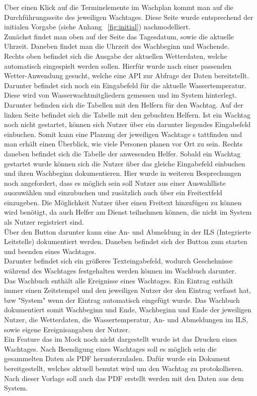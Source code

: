\documentclass[fontsize=12pt,openright,oneside,paper=a4,BCOR=1cm]{scrbook}
\begin{document}
Über einen Klick auf die Terminelemente im Wachplan kommt man auf die Durchführungsseite des jeweiligen Wachtages. Diese Seite wurde entsprechend der initialen Vorgabe (siehe Anhang ~\ref{fig:initial}) nachmodelliert. \\
Zunächst findet man oben auf der Seite das Tagesdatum, sowie die aktuelle Uhrzeit. Daneben findet man die Uhrzeit des Wachbeginn und Wachende. \\
Rechts oben befindet sich die Ausgabe der aktuellen Wetterdaten, welche automatisch eingespielt werden sollen. Hierfür wurde nach einer passenden Wetter-Anwendung gesucht, welche eine API zur Abfrage der Daten bereitstellt. Darunter befindet sich noch ein Eingabefeld für die aktuelle Wassertemperatur. Diese wird von Wasserwachtmitgliedern gemessen und im System hinterlegt. \\ 
Darunter befinden sich die Tabellen mit den Helfern für den Wachtag. Auf der linken Seite befindet sich die Tabelle mit den gebuchten Helfern. Ist ein Wachtag noch nicht gestartet, können sich Nutzer über ein darunter liegendes Eingabefeld einbuchen. Somit kann eine Planung der jeweiligen Wachtage s
tattfinden und man erhält einen Überblick, wie viele Personen planen vor Ort zu sein. Rechts daneben befindet sich die Tabelle der anwesenden Helfer. Sobald ein Wachtag gestartet wurde können sich die Nutzer über das gleiche Eingabefeld einbuchen und ihren Wachbeginn dokumentieren. Hier wurde in weiteren Besprechungen noch angefordert, dass es möglich sein soll Nutzer aus einer Auswahlliste auszuwählen und einzubuchen und zusätzlich auch über ein Freitextfeld einzugeben. Die Möglichkeit Nutzer über einen Freitext hinzufügen zu können wird benötigt, da auch Helfer am Dienst teilnehmen können, die nicht im System als Nutzer registriert sind. \\
Über den Button darunter kann eine An- und Abmeldung in der ILS (Integrierte Leitstelle) dokumentiert werden. Daneben befindet sich der Button zum starten und beenden eines Wachtages.\\
Darunter befindet sich ein größeres Texteingabefeld, wodurch Geschehnisse während des Wachtages festgehalten werden können im Wachbuch darunter. \\
Das Wachbuch enthält alle Ereignisse eines Wachtages. Ein Eintrag enthält immer einen Zeitstempel und den jeweiligen Nutzer der den Eintrag verfasst hat, bzw "System" wenn der Eintrag automatisch eingefügt wurde. Das Wachbuch dokumentiert somit Wachbeginn und Ende, Wachbeginn und Ende der jeweiligen Nutzer, die Wetterdaten, die Wassertemperatur, An- und Abmeldungen im ILS, sowie eigene Ereignisangaben der Nutzer.\\
Ein Feature das im Mock noch nicht dargestellt wurde ist das Drucken eines Wachtages. Nach Beendigung eines Wachtages soll es möglich sein die gesammelten Daten als PDF herunterzuladen. Dafür wurde ein Dokument bereitgestellt, welches aktuell benutzt wird um den Wachtag zu protokollieren. Nach dieser Vorlage soll auch das PDF erstellt werden mit den Daten aus dem System.
\end{document}
